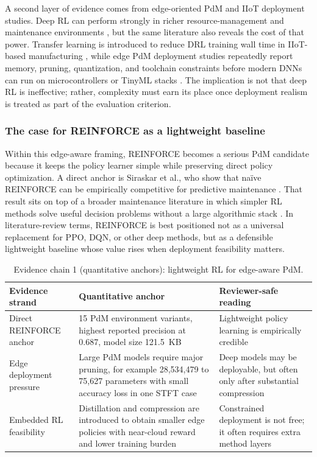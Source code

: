 \documentclass[sn-basic]{sn-jnl} %
\begin{document}
A second layer of evidence comes from edge-oriented PdM and IIoT deployment studies. Deep RL can perform strongly in richer resource-management and maintenance environments \cite{Ong2022-01, Ong2022-02}, but the same literature also reveals the cost of that power. Transfer learning is introduced to reduce DRL training wall time in IIoT-based manufacturing \cite{Ong2022-02}, while edge PdM deployment studies repeatedly report memory, pruning, quantization, and toolchain constraints before modern DNNs can run on microcontrollers or TinyML stacks \cite{Pandey2023, Njor2024}. The implication is not that deep RL is ineffective; rather, complexity must earn its place once deployment realism is treated as part of the evaluation criterion.

\subsubsection{The case for REINFORCE as a lightweight baseline}
Within this edge-aware framing, REINFORCE becomes a serious PdM candidate because it keeps the policy learner simple while preserving direct policy optimization. A direct anchor is Siraskar et al., who show that na\"{i}ve REINFORCE can be empirically competitive for predictive maintenance \cite{Siraskar2025}. That result sits on top of a broader maintenance literature in which simpler RL methods solve useful decision problems without a large algorithmic stack \cite{Wang2014, Adsule2020, Yousefi2020}. In literature-review terms, REINFORCE is best positioned not as a universal replacement for PPO, DQN, or other deep methods, but as a defensible lightweight baseline whose value rises when deployment feasibility matters.

\begin{table}[t]
        \centering
        \small
        \setlength{\tabcolsep}{4pt}
        \begin{tabular}{p{} p{} p{}}
                \toprule
                Evidence strand & Quantitative anchor & Reviewer-safe reading \\
                \midrule
                Direct REINFORCE anchor & 15 PdM environment variants, highest reported precision at 0.687, model size 121.5~KB \cite{Siraskar2025} & Lightweight policy learning is empirically credible \\
                Edge deployment pressure & Large PdM models require major pruning, for example 28,534,479 to 75,627 parameters with small accuracy loss in one STFT case \cite{Pandey2023} & Deep models may be deployable, but often only after substantial compression \\
                Embedded RL feasibility & Distillation and compression are introduced to obtain smaller edge policies with near-cloud reward and lower training burden \cite{Jang2020, Xu2022, Szydlo2022} & Constrained deployment is not free; it often requires extra method layers \\
                \bottomrule
        \end{tabular}
        \caption{Evidence chain 1 (quantitative anchors): lightweight RL for edge-aware PdM.}
        \label{tab:evidence_chain1_quant}
\end{table}
\end{document}
